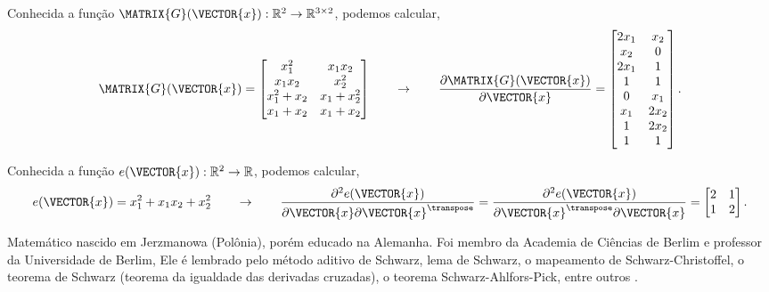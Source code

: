 \begin{example}
Conhecida a função $\MATRIX{G}(\VECTOR{x}): \mathbb{R}^2 \rightarrow \mathbb{R}^{3 \times 2}$, podemos calcular,
\begin{equation}
\MATRIX{G}(\VECTOR{x})=
\begin{bmatrix}
x_1^2       & x_1 x_2\\
x_1 x_2     & x_2^2\\
x_1^2 + x_2 & x_1 + x_2^2\\
x_1 + x_2   & x_1 + x_2
\end{bmatrix}
\qquad \rightarrow \qquad
\frac{\partial \MATRIX{G}(\VECTOR{x}) }{\partial \VECTOR{x}}= 
\begin{bmatrix}
2 x_1 & x_2\\ 
  x_2 & 0  \\ 
2 x_1 & 1  \\ 
    1 & 1  \\ 
0   &   x_1\\
x_1 & 2 x_2\\
1   & 2 x_2\\
1   & 1
\end{bmatrix}.
\end{equation}
\end{example}

\begin{example}
Conhecida a função $e(\VECTOR{x}): \mathbb{R}^2 \rightarrow \mathbb{R}$, podemos calcular,
\begin{equation}
e(\VECTOR{x})=x_1^2+x_1 x_2+x_2^2
\qquad \rightarrow \qquad
\frac{\partial^2 e(\VECTOR{x}) }{\partial \VECTOR{x} \partial \VECTOR{x}^{\transpose}}=
\frac{\partial^2 e(\VECTOR{x}) }{\partial \VECTOR{x}^{\transpose} \partial \VECTOR{x}}=
\begin{bmatrix}
 2 & 1 \\
 1 & 2
\end{bmatrix}.
\end{equation}
\end{example}

\begin{elaboracion}[title=Karl Hermann Amandus Schwarz (1843-1921), width= 0.99\linewidth]
Matemático nascido em Jerzmanowa (Polônia), porém  educado na Alemanha.
Foi membro da Academia de Ciências de Berlim e professor da Universidade de Berlim,
Ele é lembrado pelo método aditivo de Schwarz, lema de Schwarz, o mapeamento de Schwarz-Christoffel, 
o teorema de Schwarz (teorema da igualdade das derivadas cruzadas), o teorema Schwarz-Ahlfors-Pick, entre outros \cite[pp. 297]{agarwal2014creators}.
\end{elaboracion}

